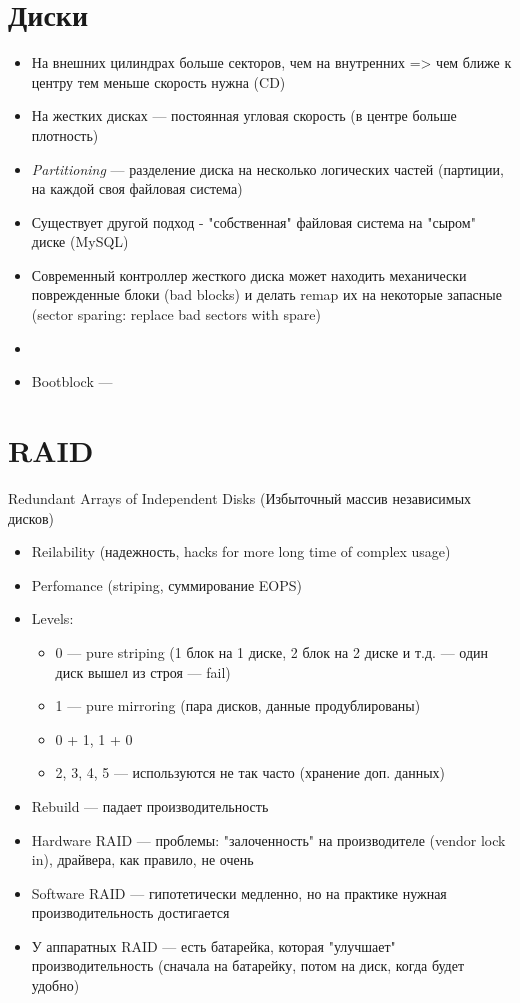 \documentclass[../lectures.tex]{subfiles}
\begin{document}
\section{Диски}
\begin{itemize}
    \item На внешних цилиндрах больше секторов, чем на внутренних 
          => чем ближе к центру тем меньше скорость нужна (CD)
    \item На жестких дисках --- постоянная угловая скорость 
          (в центре больше плотность)
    \item \emph{Partitioning} --- разделение диска на несколько 
          логических частей (партиции, на каждой своя файловая система)
    \item Существует другой подход - "собственная" файловая система 
          на "сыром" диске (MySQL)
    \item Современный контроллер жесткого диска может находить механически поврежденные блоки (bad blocks) и делать remap их на некоторые запасные (sector sparing: replace bad sectors with spare)
    \item {}
    \item Bootblock --- \todo{}
\end{itemize}

\section{RAID}
Redundant Arrays of Independent Disks (Избыточный массив независимых дисков)
\begin{itemize}
    \item Reilability (надежность, hacks for more long time of complex usage)
    \item Perfomance (striping, суммирование EOPS)
    \item Levels:
        \begin{itemize}
            \item 0 --- pure striping (1 блок на 1 диске, 2 блок на 2 диске и т.д. --- один диск вышел из строя --- fail)
            \item 1 --- pure mirroring (пара дисков, данные продублированы)
            \item 0 + 1, 1 + 0
            \item 2, 3, 4, 5 --- используются не так часто (хранение доп. данных)
        \end{itemize}
    \item Rebuild --- падает производительность
    \item Hardware RAID --- проблемы: "залоченность" на производителе (vendor lock in), драйвера, как правило, не очень
    \item Software RAID --- гипотетически медленно, но на практике нужная производительность достигается
    \item У аппаратных RAID --- есть батарейка, которая "улучшает" производительность 
          (сначала на батарейку, потом на диск, когда будет удобно)
\end{itemize}
\end{document}
